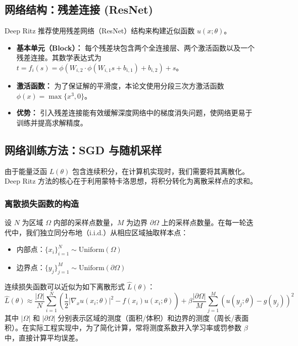 	\subsection{网络结构：残差连接 (ResNet)}
	Deep Ritz 推荐使用残差网络（ResNet）结构来构建近似函数 $u(x; \theta)$。
	\begin{itemize}
		\item \textbf{基本单元（Block）：} 每个残差块包含两个全连接层、两个激活函数以及一个残差连接。其数学表达式为 $t = f_i(s) = \phi(W_{i,2} \cdot \phi(W_{i,1}s + b_{i,1}) + b_{i,2}) + s$。
		\item \textbf{激活函数：} 为了保证解的平滑度，本论文使用分段三次方激活函数 $\phi(x) = \max\{x^3, 0\}$。
		\item \textbf{优势：} 引入残差连接能有效缓解深度网络中的梯度消失问题，使网络更易于训练并提高求解精度。
	\end{itemize}
	
	\subsection{网络训练方法：SGD 与随机采样}
	
	由于能量泛函 $L(\theta)$ 包含连续积分，在计算机实现时，我们需要将其离散化。Deep Ritz 方法的核心在于利用蒙特卡洛思想，将积分转化为离散采样点的求和。
	
	\subsubsection{离散损失函数的构造}
	设 $N$ 为区域 $\Omega$ 内部的采样点数量，$M$ 为边界 $\partial\Omega$ 上的采样点数量。在每一轮迭代中，我们独立同分布地（i.i.d.）从相应区域抽取样本点：
	\begin{itemize}
		\item 内部点：$\{x_i\}_{i=1}^N \sim \text{Uniform}(\Omega)$
		\item 边界点：$\{y_j\}_{j=1}^M \sim \text{Uniform}(\partial\Omega)$
	\end{itemize}
	
	连续损失函数可以近似为如下离散形式 $\hat{L}(\theta)$：
	\begin{equation}
		\hat{L}(\theta) \approx \frac{|\Omega|}{N} \sum_{i=1}^{N} \left( \frac{1}{2} |\nabla_x u(x_i; \theta)|^2 - f(x_i)u(x_i; \theta) \right) + \beta \frac{|\partial\Omega|}{M} \sum_{j=1}^{M} (u(y_j; \theta) - g(y_j))^2
	\end{equation}
	其中 $|\Omega|$ 和 $|\partial\Omega|$ 分别表示区域的测度（面积/体积）和边界的测度（周长/表面积）。在实际工程实现中，为了简化计算，常将测度系数并入学习率或罚参数 $\beta$ 中，直接计算平均误差。
	
